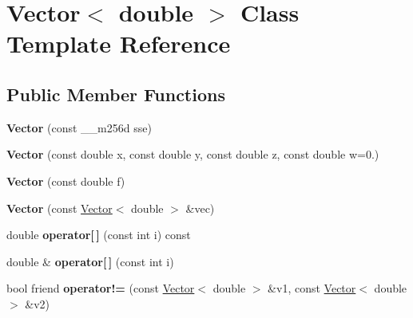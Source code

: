 \hypertarget{classVector_3_01double_01_4}{}\section{Vector$<$ double $>$ Class Template Reference}
\label{classVector_3_01double_01_4}
\subsection*{Public Member Functions}
\begin{DoxyCompactItemize}
\item 
\hypertarget{classVector_3_01double_01_4_a26369b191be820080c511acc28835f16}{}\label{classVector_3_01double_01_4_a26369b191be820080c511acc28835f16} 
{\bfseries Vector} (const \+\_\+\+\_\+m256d sse)
\item 
\hypertarget{classVector_3_01double_01_4_a73bd4f094721049b9bae7d101a9dc6c6}{}\label{classVector_3_01double_01_4_a73bd4f094721049b9bae7d101a9dc6c6} 
{\bfseries Vector} (const double x, const double y, const double z, const double w=0.)
\item 
\hypertarget{classVector_3_01double_01_4_a5bb1268fdde809f5f6b63da74424cc5a}{}\label{classVector_3_01double_01_4_a5bb1268fdde809f5f6b63da74424cc5a} 
{\bfseries Vector} (const double f)
\item 
\hypertarget{classVector_3_01double_01_4_a5b826f833a0b5bece0a0387c5cb9bf23}{}\label{classVector_3_01double_01_4_a5b826f833a0b5bece0a0387c5cb9bf23} 
{\bfseries Vector} (const \hyperlink{classVector}{Vector}$<$ double $>$ \&vec)
\item 
\hypertarget{classVector_3_01double_01_4_ae7dedcba48bfb8e3eb7ce79afe40eda8}{}\label{classVector_3_01double_01_4_ae7dedcba48bfb8e3eb7ce79afe40eda8} 
double {\bfseries operator\mbox{[}$\,$\mbox{]}} (const int i) const
\item 
\hypertarget{classVector_3_01double_01_4_a4958da49f3843c6e803ef4dc98db0b92}{}\label{classVector_3_01double_01_4_a4958da49f3843c6e803ef4dc98db0b92} 
double \& {\bfseries operator\mbox{[}$\,$\mbox{]}} (const int i)
\item 
\hypertarget{classVector_3_01double_01_4_a5d4eb8a8f8d4a922801c19b1fecf4146}{}\label{classVector_3_01double_01_4_a5d4eb8a8f8d4a922801c19b1fecf4146} 
bool friend {\bfseries operator!=} (const \hyperlink{classVector}{Vector}$<$ double $>$ \&v1, const \hyperlink{classVector}{Vector}$<$ double $>$ \&v2)
\item 
\hypertarget{classVector_3_01double_01_4_aaf08a7d3099f7ee11da206dd338109d4}{}\label{classVector_3_01double_01_4_aaf08a7d3099f7ee11da206dd338109d4} 

\end{DoxyCompactItemize}
